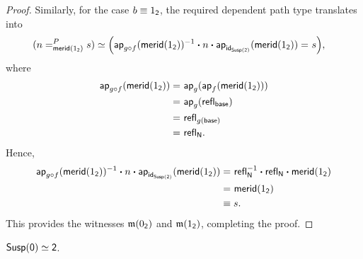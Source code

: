 \begin{proof}
    Similarly, for the case $b\equiv1_{\mathsf{2}}$, the required dependent path type translates into
    \begin{align*}
        (n=_{\mathsf{merid}(1_{\mathsf{2}})}^{P}s)
            &\simeq
                \Bigl(
                    \mathsf{ap}_{g\circ f}(\mathsf{merid}
                        (1_{\mathsf{2}}))^{-1}
                    \mathbin{\boldsymbol{\cdot}} n
                    \mathbin{\boldsymbol{\cdot}} \mathsf{ap}_{\mathsf{id}_{\mathsf{Susp}(\mathsf{2})}}
                        (\mathsf{merid}(1_{\mathsf{2}}))
                    \mathrel{=_{}}s
                \Bigr),
    \end{align*}
    where
    \begin{align*}
        \mathsf{ap}_{g\circ f}(\mathsf{merid}(1_{\mathsf{2}}))
            &\mathrel{=_{}}\mathsf{ap}_g(\mathsf{ap}_f
                (\mathsf{merid}(1_{\mathsf{2}})))\\
            &\mathrel{=_{}}\mathsf{ap}_g(\mathsf{refl}_{\mathsf{base}})\\
            &\mathrel{=_{}}\mathsf{refl}_{g(\mathsf{base})}\\
            &\mathrel{=_{}}\mathsf{refl}_{\mathsf{N}}.
    \end{align*}
    Hence,
    \begin{align*}
        \mathsf{ap}_{g\circ f}(\mathsf{merid}(1_{\mathsf{2}}))^{-1}
            \mathbin{\boldsymbol{\cdot}} n
            \mathbin{\boldsymbol{\cdot}} \mathsf{ap}_{\mathsf{id}_{\mathsf{Susp}(\mathsf{2})}}(\mathsf{merid}(1_{\mathsf{2}}))
        &\mathrel{=_{}}
            \mathsf{refl}_{\mathsf{N}}^{-1}
            \mathbin{\boldsymbol{\cdot}} \mathsf{refl}_{\mathsf{N}}
            \mathbin{\boldsymbol{\cdot}} \mathsf{merid}(1_{\mathsf{2}})\\
        &\mathrel{=_{}}
            \mathsf{merid}(1_{\mathsf{2}})\\
        &\equiv s.
    \end{align*}
    This provides the witnesses $\mathfrak m(0_{\mathsf{2}})$ and $\mathfrak m(1_{\mathsf{2}})$, completing the proof.
\end{proof}

\begin{lem}\label{lem:Susp(S-1)=S0}
    $\mathsf{Susp}(\mathsf{0})\simeq\mathsf{2}$.
\end{lem}

